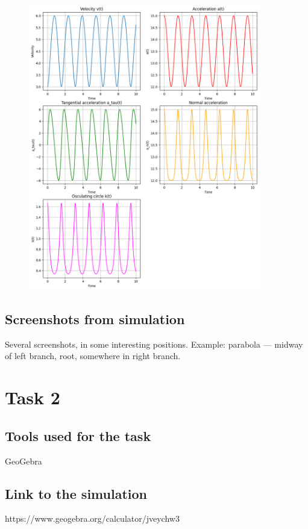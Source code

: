 \documentclass{article}
\begin{document}
\begin{figure}[H]
    \centering
    \includegraphics[width=0.9\textwidth]{Task1.png}
\end{figure}

\subsection{Screenshots from simulation}

Several screenshots, in some interesting positions. Example: parabola —
midway of left branch, root, somewhere in right branch.


\section{Task 2}

\subsection{Tools used for the task}
GeoGebra

\subsection{Link to the simulation}
https://www.geogebra.org/calculator/jveychw3
\end{document}
